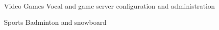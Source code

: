 
\begin{cvskills}

	\cvskill
	{Video Games}
    {Vocal and game server configuration and administration}

	\cvskill
	{Sports}
    {Badminton and snowboard}

\end{cvskills}
